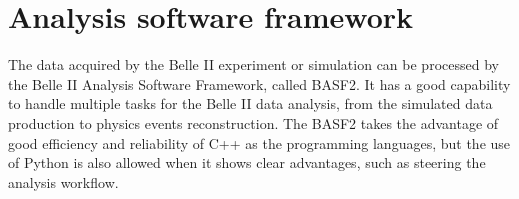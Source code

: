 \begin{comment}
The mixing of background is then implemented to provide a realistic view of physical events and beam background overlay. Since the format of beam background is simulated hits, thus adding the background events is done by injecting the simulated hits, then move to the digitization of hits to detector responses. In a event time window $\Delta t$, assuming the given type background has a average rate of $R$, the mixing number of background hits in such event is: 

\begin{equation}
\bar{N} = sR\Delta{t}
\end{equation}

$s$ is optional scaling factor which can be used to study the influence of given type background in different level. Because $R$ is averaged value, in the actual mixing, the number of $\bar{N}$ is used as the expected value of Poisson distribution, which presents the number of observed events when many trials of such events is made with certain small possibility per event.  In order to simulate the effect of timing different of background and physical events, the mixing timing window over $\Delta t$ is randomly shift according to the physical events.
With the real experimental data comes in handy, the method of adding background events to physics events is slightly different since using real beam background can provide a more precise result than simulation. By setting a random trigger for beam background, the hits digitization from real beam background will be collected and add to simulated physics events. Although the pile-up noise collected in this method is not very precise because of the threshold set for detectors allowing only part of noise to be added, the non-recorded noise can still contribute to the pile-up noise for physics events, and they are not included in this method. Yet overall it provides a more realistic evaluation of beam background overlay.

\end{comment}

\section{Analysis software framework} 
The data acquired by the Belle II experiment or simulation can be processed by the Belle II Analysis Software Framework, called BASF2. It has a good capability to handle multiple tasks for the Belle II data analysis, from the simulated data production to physics events reconstruction. The BASF2 takes the advantage of good efficiency and reliability of C++ as the programming languages, but the use of
Python is also allowed when it shows clear advantages, such as steering the analysis workflow. 

